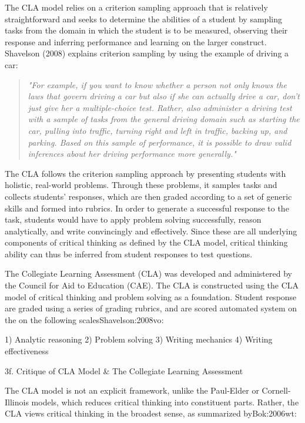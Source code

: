 The CLA model relies on a criterion sampling approach that is relatively straightforward and seeks to determine the abilities of a student by sampling tasks from the domain in which the student is to be measured, observing their response and inferring performance and learning on the larger construct. Shavelson (2008) explains criterion sampling by using the example of driving a car:

\begin{quote}
\textit{"For example, if you want to know whether a person not only knows the laws that govern driving a car but also if she can actually drive a car, don’t just give her a multiple-choice test. Rather, also administer a driving test with a sample of tasks from the general driving domain such as starting the car, pulling into traffic, turning right and left in traffic, backing up, and parking. Based on this sample of performance, it is possible to draw valid inferences about her driving performance more generally." }
\end{quote}

The CLA follows the criterion sampling approach by presenting students with holistic, real-world problems. Through these problems, it samples tasks and collects students’ responses, which are then graded according to a set of generic skills and formed into rubrics. In order to generate a successful response to the task, students would have to apply problem solving successfully, reason analytically, and write convincingly and effectively. Since these are all underlying components of critical thinking as defined by the CLA model, critical thinking ability can thus be inferred from student responses to test questions.

The Collegiate Learning Assessment (CLA) was developed and administered by the Council for Aid to Education (CAE).  The CLA is constructed using the CLA model of critical thinking and problem solving as a foundation. Student response are graded using a series of grading rubrics, and are scored automated system on the on the following scales{Shavelson:2008vo}:

1)	Analytic reasoning
2)	Problem solving
3)	Writing mechanics
4)	Writing effectiveness

3f. Critique of CLA Model & The Collegiate Learning Assessment

The CLA model is not an explicit framework, unlike the Paul-Elder or Cornell-Illinois models, which reduces critical thinking into constituent parts. Rather, the CLA views critical thinking in the broadest sense, as summarized by{Bok:2006wt}:

